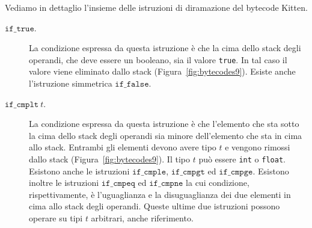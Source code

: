 Vediamo in dettaglio l'insieme delle istruzioni di diramazione del
bytecode Kitten.
%
\begin{description}
\item[\underline{$\mathtt{if\_true}$}.]
  La condizione espressa da questa istruzione \`e che la cima dello stack degli
  operandi, che deve essere un booleano, sia il valore \texttt{true}.
  In tal caso il valore
  viene eliminato dallo stack (Figura~\ref{fig:bytecodes9}).
  Esiste anche l'istruzione simmetrica $\mathtt{if\_false}$.
\item[\underline{$\mathtt{if\_cmplt}\ t$}.]
  La condizione espressa da questa istruzione \`e che l'elemento che sta
  sotto la cima dello stack degli operandi sia minore dell'elemento che sta in
  cima allo stack. Entrambi gli elementi devono avere tipo $t$
  e vengono rimossi dallo
  stack (Figura~\ref{fig:bytecodes9}). Il tipo $t$ pu\`o essere \texttt{int}
  o \texttt{float}. Esistono anche le istruzioni $\mathtt{if\_cmple}$,
  $\mathtt{if\_cmpgt}$ ed $\mathtt{if\_cmpge}$. Esistono inoltre le
  istruzioni $\mathtt{if\_cmpeq}$ ed $\mathtt{if\_cmpne}$ la cui condizione,
  rispettivamente, \`e l'uguaglianza e la disuguaglianza dei due elementi
  in cima allo stack degli operandi. Queste ultime due istruzioni
  possono operare su tipi $t$ arbitrari, anche riferimento.
\end{description}
%
